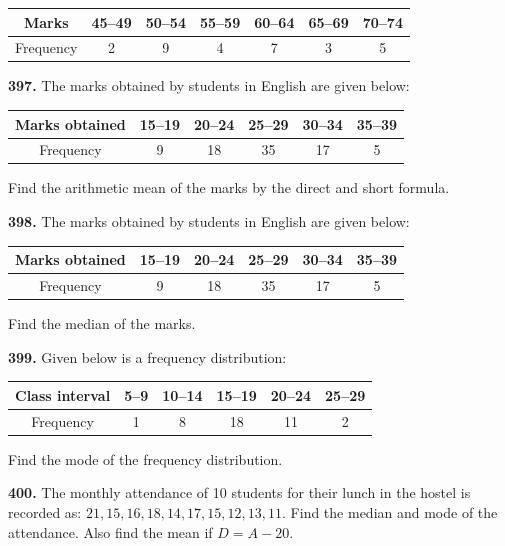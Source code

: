 \documentclass[11pt]{article}
\begin{document}
\begin{center}
\begin{tabular}{|c|c|c|c|c|c|c|}
\hline
Marks & 45--49 & 50--54 & 55--59 & 60--64 & 65--69 & 70--74 \\
\hline
Frequency & 2 & 9 & 4 & 7 & 3 & 5 \\
\hline
\end{tabular}
\end{center}

\bigskip
\noindent\textbf{397.} The marks obtained by students in English are given below:

\begin{center}
\begin{tabular}{|c|c|c|c|c|c|}
\hline
Marks obtained & 15--19 & 20--24 & 25--29 & 30--34 & 35--39 \\
\hline
Frequency & 9 & 18 & 35 & 17 & 5 \\
\hline
\end{tabular}
\end{center}

Find the arithmetic mean of the marks by the direct and short formula.

\bigskip
\noindent\textbf{398.} The marks obtained by students in English are given below:

\begin{center}
\begin{tabular}{|c|c|c|c|c|c|}
\hline
Marks obtained & 15--19 & 20--24 & 25--29 & 30--34 & 35--39 \\
\hline
Frequency & 9 & 18 & 35 & 17 & 5 \\
\hline
\end{tabular}
\end{center}

Find the median of the marks.

\bigskip
\noindent\textbf{399.} Given below is a frequency distribution:

\begin{center}
\begin{tabular}{|c|c|c|c|c|c|}
\hline
Class interval & 5--9 & 10--14 & 15--19 & 20--24 & 25--29 \\
\hline
Frequency & 1 & 8 & 18 & 11 & 2 \\
\hline
\end{tabular}
\end{center}

Find the mode of the frequency distribution.

\bigskip
\noindent\textbf{400.} The monthly attendance of 10 students for their lunch in the hostel is recorded as: $21, 15, 16, 18, 14, 17, 15, 12, 13, 11$. Find the median and mode of the attendance. Also find the mean if $D = A - 20$.
\end{document}
